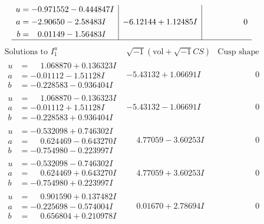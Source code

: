 \documentclass[1p]{elsarticle_modified}
\theoremstyle{definition}
\newcommand{\I}{\sqrt{-1}}
\begin{document}
$$\begin{array}{c|c|c}
\begin{aligned}
u &= -0.971552 - 0.444847 I \\
a &= -2.90650 - 2.58483 I \\
b &= \phantom{-}0.01149 - 1.56483 I\end{aligned}
 & -6.12144 + 1.12485 I & \phantom{-0.000000 } 0\\
 \hline 
 \end{array}$$\newpage$$\begin{array}{c|c|c}  
\text{Solutions to }I^u_{1}& \I (\text{vol} + \sqrt{-1}CS) & \text{Cusp shape}\\
 \hline 
\begin{aligned}
u &= \phantom{-}1.068870 + 0.136323 I \\
a &= -0.01112 - 1.51128 I \\
b &= -0.228583 - 0.936404 I\end{aligned}
 & -5.43132 + 1.06691 I & \phantom{-0.000000 } 0 \\ \hline\begin{aligned}
u &= \phantom{-}1.068870 - 0.136323 I \\
a &= -0.01112 + 1.51128 I \\
b &= -0.228583 + 0.936404 I\end{aligned}
 & -5.43132 - 1.06691 I & \phantom{-0.000000 } 0 \\ \hline\begin{aligned}
u &= -0.532098 + 0.746302 I \\
a &= \phantom{-}0.624469 - 0.643270 I \\
b &= -0.754980 - 0.223997 I\end{aligned}
 & \phantom{-}4.77059 - 3.60253 I & \phantom{-0.000000 } 0 \\ \hline\begin{aligned}
u &= -0.532098 - 0.746302 I \\
a &= \phantom{-}0.624469 + 0.643270 I \\
b &= -0.754980 + 0.223997 I\end{aligned}
 & \phantom{-}4.77059 + 3.60253 I & \phantom{-0.000000 } 0 \\ \hline\begin{aligned}
u &= \phantom{-}0.901590 + 0.137482 I \\
a &= -0.225698 - 0.574004 I \\
b &= \phantom{-}0.656804 + 0.210978 I\end{aligned}
 & \phantom{-}0.01670 + 2.78694 I & \phantom{-0.000000 } 0 \\ \hline\begin{aligned}

\end{aligned}
\end{array}$$
\end{document}

